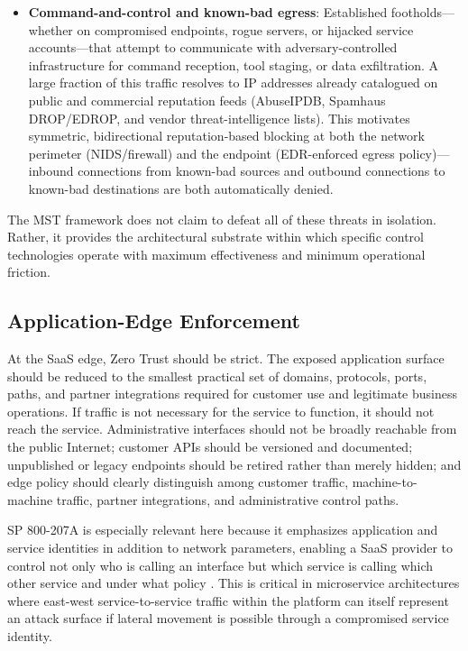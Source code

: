 \documentclass[acmlarge]{acmart}
\begin{document}
\begin{itemize}
\item \textbf{Command-and-control and known-bad egress}: Established footholds---whether
      on compromised endpoints, rogue servers, or hijacked service accounts---that
      attempt to communicate with adversary-controlled infrastructure for command
      reception, tool staging, or data exfiltration. A large fraction of this traffic
      resolves to IP addresses already catalogued on public and commercial reputation
      feeds (AbuseIPDB, Spamhaus DROP/EDROP, and vendor threat-intelligence lists).
      This motivates symmetric, bidirectional reputation-based blocking at both the
      network perimeter (NIDS/firewall) and the endpoint (EDR-enforced egress
      policy)---inbound connections from known-bad sources and outbound connections
      to known-bad destinations are both automatically denied.
\end{itemize}

The MST framework does not claim to defeat all of these threats in isolation.
Rather, it provides the architectural substrate within which specific control technologies
operate with maximum effectiveness and minimum operational friction.

\subsection{Application-Edge Enforcement}
\label{sec:edge}

At the SaaS edge, Zero Trust should be strict. The exposed application surface should be
reduced to the smallest practical set of domains, protocols, ports, paths, and partner
integrations required for customer use and legitimate business operations. If traffic is
not necessary for the service to function, it should not reach the service. Administrative
interfaces should not be broadly reachable from the public Internet; customer APIs should
be versioned and documented; unpublished or legacy endpoints should be retired rather than
merely hidden; and edge policy should clearly distinguish among customer traffic,
machine-to-machine traffic, partner integrations, and administrative control paths.

SP 800-207A is especially relevant here because it emphasizes application and service
identities in addition to network parameters, enabling a SaaS provider to control not only
who is calling an interface but which service is calling which other service and under what
policy \cite{chandramouli2023}. This is critical in microservice architectures where
east-west service-to-service traffic within the platform can itself represent an attack
surface if lateral movement is possible through a compromised service identity.
\end{document}
